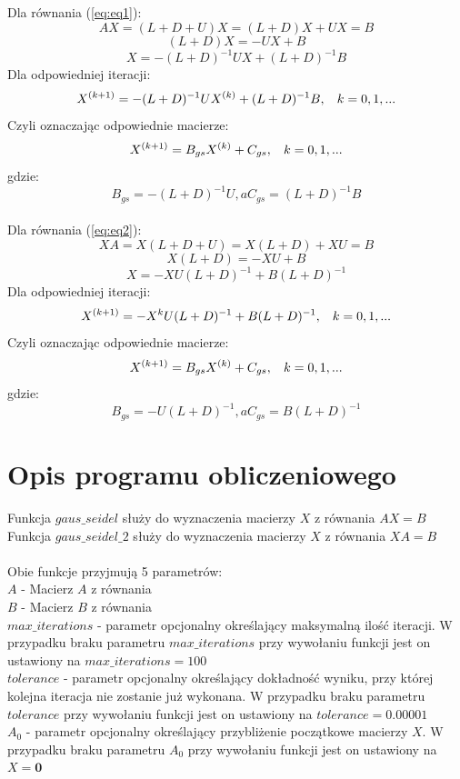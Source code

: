 \documentclass[12pt]{article}
\begin{document}
Dla równania (\ref{eq:eq1}):\\

\[
AX=(L+D+U)X=(L+D)X+UX=B
\]
\[
(L+D)X=-UX+B
\]
\[
X=-(L+D)^{-1}UX+(L+D)^{-1}B
\]
Dla odpowiedniej iteracji:
\[
X^{(k+1)}=-(L+D)^{-1}UX^{(k)}+(L+D)^{-1}B,\hskip2ex k=0,1,...
\]
Czyli oznaczając odpowiednie macierze:
\[
X^{(k+1)}=B_{gs}X^{(k)}+C_{gs},\hskip2ex k=0,1,...
\]
gdzie:
\[
B_{gs}=-(L+D)^{-1}U, a C_{gs}=(L+D)^{-1}B
\]\\


Dla równania (\ref{eq:eq2}):\\

\[
XA=X(L+D+U)=X(L+D)+XU=B
\]
\[
X(L+D)=-XU+B
\]
\[
X=-XU(L+D)^{-1}+B(L+D)^{-1}
\]
Dla odpowiedniej iteracji:
\[
X^{(k+1)}=-X^{k}U(L+D)^{-1}+B(L+D)^{-1},\hskip2ex k=0,1,...
\]
Czyli oznaczając odpowiednie macierze:
\[
X^{(k+1)}=B_{gs}X^{(k)}+C_{gs},\hskip2ex k=0,1,...
\]
gdzie:
\[
B_{gs}=-U(L+D)^{-1}, a C_{gs}=B(L+D)^{-1}
\]


\section{Opis programu obliczeniowego}

\noindent Funkcja $gaus\_seidel$ służy do wyznaczenia macierzy $X$ z równania $AX=B$\\
Funkcja $gaus\_seidel\_2$ służy do wyznaczenia macierzy $X$ z równania $XA=B$\\ \\
Obie funkcje przyjmują 5 parametrów:\\

$A$ - Macierz $A$ z równania\\

$B$ - Macierz $B$ z równania\\

$max\_iterations$ - parametr opcjonalny określający maksymalną ilość iteracji. W przypadku braku parametru $max\_iterations$ przy wywołaniu funkcji jest on ustawiony na $max\_iterations=100$\\

$tolerance$ - parametr opcjonalny określający dokładność wyniku, przy której kolejna iteracja nie zostanie już wykonana. W przypadku braku parametru $tolerance$ przy wywołaniu funkcji jest on ustawiony na $tolerance=0.00001$\\

$A_0$ - parametr opcjonalny określający przybliżenie początkowe macierzy $X$. W przypadku braku parametru $A_0$ przy wywołaniu funkcji jest on ustawiony na $X=\mathbf{0}$\\\\
\end{document}
